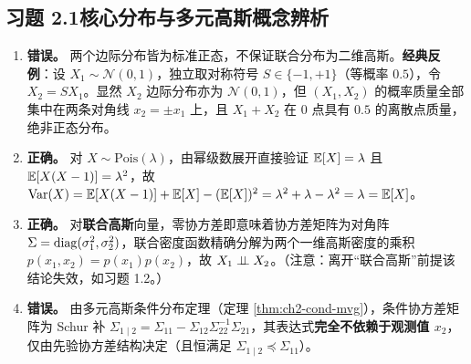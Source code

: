 \subsection*{习题 2.1\quad 核心分布与多元高斯概念辨析}
\begin{enumerate}[label=(\alph*), leftmargin=1.8em]
  \item \textbf{错误。} 两个边际分布皆为标准正态，不保证联合分布为二维高斯。\textbf{经典反例}：设 $X_1 \sim \mathcal{N}(0, 1)$，独立取对称符号 $S \in \{-1, +1\}$（等概率 $0.5$），令 $X_2 = S X_1$。显然 $X_2$ 边际分布亦为 $\mathcal{N}(0, 1)$，但 $(X_1, X_2)$ 的概率质量全部集中在两条对角线 $x_2 = \pm x_1$ 上，且 $X_1 + X_2$ 在 $0$ 点具有 $0.5$ 的离散点质量，绝非正态分布。
  \item \textbf{正确。} 对 $X \sim \mathrm{Pois}(\lambda)$，由幂级数展开直接验证 $\mathbb{E}[X] = \lambda$ 且 $\mathbb{E}[X(X-1)] = \lambda^2$，故 $\operatorname{Var}(X) = \mathbb{E}[X(X-1)] + \mathbb{E}[X] - (\mathbb{E}[X])^2 = \lambda^2 + \lambda - \lambda^2 = \lambda = \mathbb{E}[X]$。
  \item \textbf{正确。} 对\textbf{联合高斯}向量，零协方差即意味着协方差矩阵为对角阵 $\Sigma = \operatorname{diag}(\sigma_1^2, \sigma_2^2)$，联合密度函数精确分解为两个一维高斯密度的乘积 $p(x_1, x_2) = p(x_1)p(x_2)$，故 $X_1 \perp\!\!\!\perp X_2$。（注意：离开“联合高斯”前提该结论失效，如习题 1.2。）
  \item \textbf{错误。} 由多元高斯条件分布定理（定理 \ref{thm:ch2-cond-mvg}），条件协方差矩阵为 Schur 补 $\Sigma_{1\mid 2} = \Sigma_{11} - \Sigma_{12}\Sigma_{22}^{-1}\Sigma_{21}$，其表达式\textbf{完全不依赖于观测值 $x_2$}，仅由先验协方差结构决定（且恒满足 $\Sigma_{1\mid 2} \preceq \Sigma_{11}$）。
\end{enumerate}

